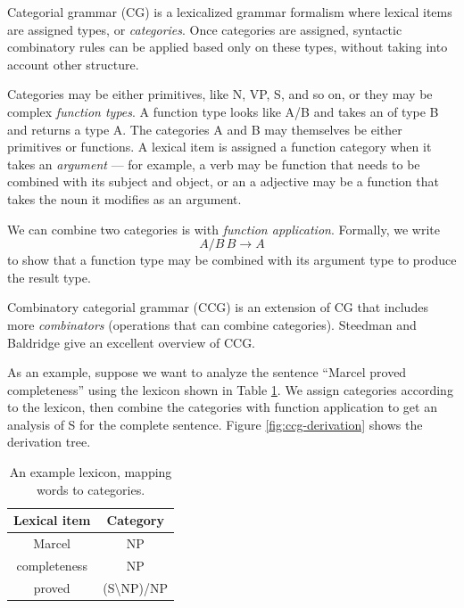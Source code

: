 \documentclass[a4paper]{article}
\begin{document}

Categorial grammar (CG) \cite{cg,bar-hillel-cg} is a lexicalized grammar formalism where lexical items are assigned types, or {\em categories}. Once categories are assigned, syntactic combinatory rules can be applied based only on these types, without taking into account other structure.

Categories may be either primitives, like N, VP, S, and so on, or they may be complex {\em function types}. A function type looks like A/B and takes an of type B and returns a type A. The categories A and B may themselves be either primitives or functions. A lexical item is assigned a function category when it takes an {\em argument} --- for example, a verb may be function that needs to be combined with its subject and object, or an a adjective may be a function that takes the noun it modifies as an argument.

We can combine two categories is with {\em function application}. Formally, we write
\begin{equation}
A/B \, B \to A \label{eqn:forward-app}
\end{equation}
to show that a function type may be combined with its argument type to produce the result type.

Combinatory categorial grammar (CCG) is an extension of CG that includes more {\em combinators} (operations that can combine categories). Steedman and Baldridge  give an excellent overview of CCG.

As an example, suppose we want to analyze the sentence ``Marcel proved completeness'' using the lexicon shown in Table \ref{table:lexicon}. We assign categories according to the lexicon, then combine the categories with function application to get an analysis of S for the complete sentence. Figure \ref{fig:ccg-derivation} shows the derivation tree.

\begin{table}
\centering
\begin{tabular}{|c|c|}
\hline
Lexical item & Category \\
\hline
Marcel & NP \\
completeness & NP \\
proved & (S\textbackslash NP)/NP \\
\hline
\end{tabular}
\caption{An example lexicon, mapping words to categories.\label{table:lexicon}}
\end{table}
\end{document}
